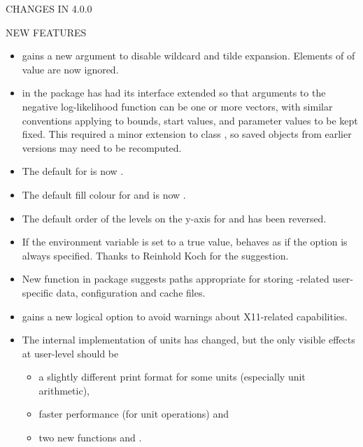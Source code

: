 \documentclass[letterpaper]{book}
\begin{document}
\begin{Section}{ CHANGES IN 4.0.0}
\begin{SubSection}{NEW FEATURES}
\begin{itemize}
\item{}   gains a new argument  to disable
wildcard and tilde expansion.  Elements of  of value
 are now ignored.

\item{}  in the  package has had its
interface extended so that arguments to the negative
log-likelihood function can be one or more vectors, with similar
conventions applying to bounds, start values, and parameter values
to be kept fixed.  This required a minor extension to class
, so saved objects from earlier versions may need to
be recomputed.

\item{} The default for  is now
.

\item{} The default fill colour for  and
 is now .

\item{} The default order of the levels on the y-axis for
 and  has been reversed.

\item{} If the  environment variable is
set to a true value,  behaves as if
the  option is always specified. Thanks to
Reinhold Koch for the suggestion.

\item{} New function  in package 
suggests paths appropriate for storing \R{}-related user-specific
data, configuration and cache files.

\item{}  gains a new logical option 
to avoid warnings about X11-related capabilities.

\item{} The internal implementation of  units has changed,
but the only visible effects at user-level should be
\begin{itemize}

\item{} a slightly different print format for some units
(especially unit arithmetic),
\item{} faster performance (for unit operations) and
\item{} two new functions  and .


\end{itemize}
\end{itemize}
\end{SubSection}
\end{Section}
\end{document}
